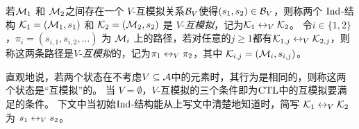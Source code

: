若${\cal M}_1$ 和 ${\cal M}_2$之间存在一个 $V$-互模拟关系${\cal B}_V$使得$(s_1, s_2)\in {\cal B}_V$，则称两个 $\textrm{Ind}$-结构 ${\cal K}_1 = ({\cal M}_1, s_1)$ 和 ${\cal K}_2 = ({\cal M}_2, s_2)$ 是 $V$-{\em 互模拟}，记为${\cal K}_1 \leftrightarrow_V {\cal K}_2$。
令$i\in \{1,2\}$，$\pi_i=(s_{i,1},s_{i,2},\ldots)$ 为 ${\cal M}_i$ 上的路径，若对任意的$j \ge 1$都有$ {\cal K}_{1,j} \leftrightarrow_V {\cal K}_{2,j}$，则称这两条路径是$V$-{\em 互模拟}的，记为$\pi_1 \leftrightarrow_V \pi_2$，其中 ${\cal K}_{i,j}=({\cal M}_i,s_{i,j})$。


直观地说，若两个状态在不考虑$V\subseteq\cal A$中的元素时，其行为是相同的，则称这两个状态是“互模拟”的。
当 $V=\emptyset$，$V$-互模拟的三个条件即为$\textrm{CTL}$中的互模拟要满足的条件。
下文中当初始$\textrm{Ind}$-结构能从上写文中清楚地知道时，简写 ${\cal K}_1 \leftrightarrow_V {\cal K}_2$ 为 $s_1 \leftrightarrow_V s_2$。

%
